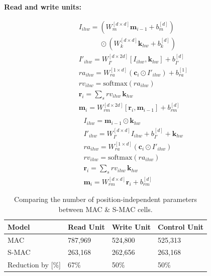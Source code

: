 \documentclass[paperwidth=36in,paperheight=48in,portrait,fontscale=0.36]{baposter}
\newcommand{\cc}{\mathbf{c}}
\newcommand{\kb}{\mathbf{k}}
\newcommand{\mem}{\mathbf{m}}
\newcommand{\rr}{\mathbf{r}}
\begin{document}
\begin{poster}
{\noindent\textbf{Read and write units:}
\begin{multicols}{2}
	\noindent
	\begin{align*}
		&I_{ihw} = (W_{m}^{[d \times d]} \mem_{i-1} + b_{m}^{[d]}) \\
		& \qquad \quad \odot (W_{k}^{[d \times d]} \kb_{hw} + b_{k}^{[d]}) \tag{r1} \\
		&I'_{ihw} =  W_{I'}^{[d \times 2d]} [I_{ihw},\kb_{hw}]  + b_{I'}^{[d]}  \tag{r2} \\
		&ra_{ihw} = W_{ra}^{[1 \times d]} (\cc_i \odot I'_{ihw}) + b_{ra}^{[1]} \tag{r3.1}\\
		&rv_{ihw} = \textrm{softmax}(ra_{ihw}) \tag{r3.2}\\
		&\rr_i = \sum_s rv_{ihw} \, \kb_{hw}  \tag{r3.3}\\
		&\mem_i = W_{rm}^{[d \times 2d]} [\rr_i, \mem_{i-1}]  + b_{rm}^{[d]} \tag{w1}
	\end{align*}
	\columnbreak
	{\begin{align*}
		&\\
		&I_{ihw} = \mem_{i-1} \odot \kb_{hw} \tag{r1} \\ 
		&I'_{ihw} = W_{I'}^{[d \times d]} I_{ihw} + b_{I'}^{[d]} + \kb_{hw} \tag{r2} \\
		&ra_{ihw} = W_{ra}^{[1 \times d]} (\cc_i \odot I'_{ihw})  \tag{r3.1}\\
		&rv_{ihw} = \textrm{softmax}(ra_{ihw}) \tag{r3.2}\\
		&\rr_i = \sum_s rv_{ihw} \, \kb_{hw}  \tag{r3.3}\\
		&\mem_i = W_{rm}^{[d \times d]} \rr_i + b_{rm}^{[d]} \tag{w1}
	\end{align*}}
\end{multicols}

\vspace{-15pt}
\begin{table}[H]
	\centering
	\caption{Comparing the number of position-independent parameters between MAC \& S-MAC cells.}
	\begin{tabular}{llll}
		\toprule
		Model        & Read Unit               & Write Unit &  Control Unit         \\
		\midrule
		MAC   &  787,969 &  524,800        &    525,313    \\
		S-MAC & 263,168  & 262,656       &    263,168 \\
		\midrule
		Reduction by [\%]  & 67\%  &   50\%       &      50\%  \\
		\bottomrule
	\end{tabular}
	\label{tab:mac_cell_parameters}
\end{table}

}
\end{poster}
\end{document}
